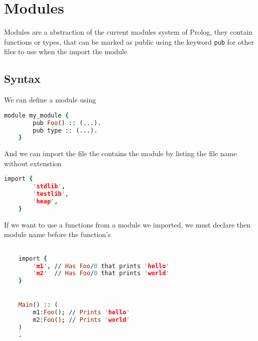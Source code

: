 \section{Modules}

Modules are a abstraction of the current modules system of Prolog, they contain
functions or types, that can be marked as public using the keyword \texttt{pub}
for other files to use when the import the module

\subsection{Syntax}

We can define a module using
\begin{lstlisting}[language =Prolog]
    module my_module {
        pub Foo() :: (...).
        pub type :: (...).
    }
\end{lstlisting}

And we can import the file the contains the module by listing the file name
without extenstion

\begin{lstlisting}[language =Prolog]
    import {
        'stdlib',
        'testlib',
        'heap',
    }
\end{lstlisting}

If we want to use a functions from a module we imported, we must declare 
then module name before the function's


\begin{lstlisting}[language =Prolog]

    import {
        'm1', // Has Foo/0 that prints 'hello'
        'm2'  // Has Foo/0 that prints 'world'
    }


    Main() :: (
        m1:Foo(); // Prints 'hello'
        m2:Foo(); // Prints 'world'
    )
    .

\end{lstlisting}





